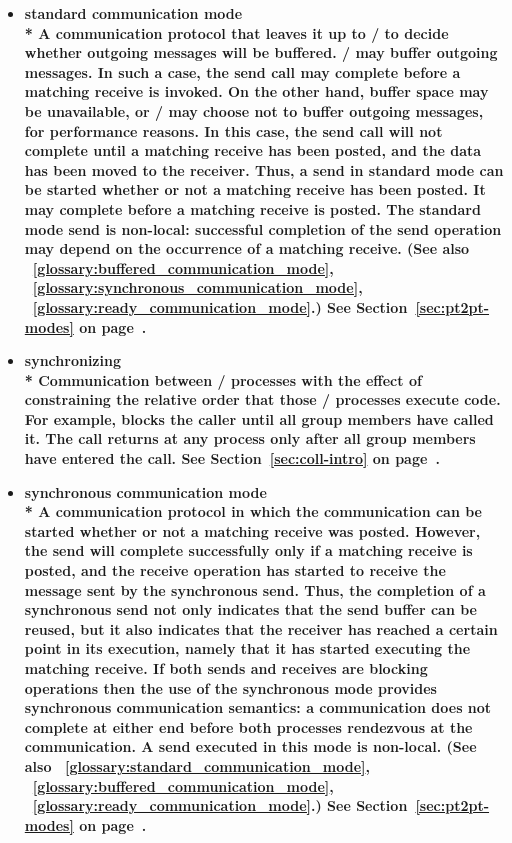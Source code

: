 \begin{itemize}
\label{glossary:standard_communication_mode}
\item \bf{ standard communication mode} \\*
A communication protocol that leaves it up to \MPI/ to decide whether outgoing
messages will be buffered.  \MPI/ may
buffer outgoing messages.  In such a case, the send call may complete
before a matching receive is invoked.  On the other hand, buffer space may be
unavailable, or \MPI/ may choose not to buffer
outgoing messages, for performance reasons. In this case,
the send call will not complete until a matching receive has been posted, and
the data has been moved to the receiver.
Thus, a send in standard mode can be started whether or not a
matching receive has been posted.  It may complete before a matching receive
is posted.  The
standard mode send is {\bf non-local}:  successful completion of the send
operation may depend on the occurrence of a matching receive. 
(See also ~\ref{glossary:buffered_communication_mode}, 
~\ref{glossary:synchronous_communication_mode},
~\ref{glossary:ready_communication_mode}.)
See Section~\ref{sec:pt2pt-modes} on page~\pageref{sec:pt2pt-modes}.

\label{glossary:synchronizing}
\item \bf{ synchronizing} \\*
Communication between \MPI/ processes with the effect of constraining the relative 
order that those \MPI/  processes execute code. For example,  
blocks the caller until all group members have called it. The call returns at any process 
only after all group members have
entered the call.
See Section~\ref{sec:coll-intro} on page~\pageref{sec:coll-intro}.

\label{glossary:synchronous_communication_mode}
\item \bf{ synchronous communication mode} \\*
A communication protocol in which the
communication can be started whether or
not a matching receive was posted.  However, the send will complete
successfully only if a matching receive is posted, and the
receive operation has started to receive the message sent by the
synchronous send.
Thus, the completion of a synchronous send not only indicates that the
send buffer can be reused, but 
it also indicates that the receiver has
reached a certain point in its execution, namely that it has started
executing the matching receive.  If both sends and receives are
blocking operations then the use of the synchronous mode provides
synchronous communication semantics: a communication does not complete
at either end before both processes rendezvous at the
communication.  A send executed in this mode is non-local.
(See also ~\ref{glossary:standard_communication_mode}, 
~\ref{glossary:buffered_communication_mode},
~\ref{glossary:ready_communication_mode}.)
See Section~\ref{sec:pt2pt-modes} on page~\pageref{sec:pt2pt-modes}.


\end{itemize}
